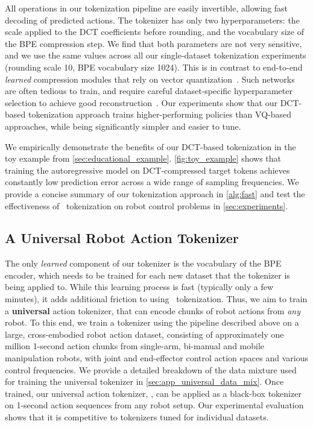 All operations in our tokenization pipeline are easily invertible, allowing fast decoding of predicted actions. The tokenizer has only two hyperparameters: the scale applied to the DCT coefficients before rounding, and the vocabulary size of the BPE compression step. We find that both parameters are not very sensitive, and we use the same values across all our single-dataset tokenization experiments (rounding scale 10, BPE vocabulary size 1024). This is in contrast to end-to-end \emph{learned} compression modules that rely on vector quantization~\cite{vqvae}. Such networks are often tedious to train, and require careful dataset-specific hyperparameter selection to achieve good reconstruction~\cite{yu2023magvit,fsq}. Our experiments show that our DCT-based tokenization approach trains higher-performing policies than VQ-based approaches, while being significantly simpler and easier to tune. %

We empirically demonstrate the benefits of our DCT-based tokenization in the toy example from \cref{sec:educational_example}. \cref{fig:toy_example} shows that training the autoregressive model on DCT-compressed target tokens achieves constantly low prediction error across a wide range of sampling frequencies. We provide a concise summary of our tokenization approach in \cref{alg:fast} and test the effectiveness of \ModelAcronym~tokenization on robot control problems in \cref{sec:experiments}. 


\subsection{A Universal Robot Action Tokenizer}
\label{sec:universal_tokenizer}

The only \emph{learned} component of our tokenizer is the vocabulary of the BPE encoder, which needs to be trained for each new dataset that the tokenizer is being applied to. While this learning process is fast (typically only a few minutes), it adds additional friction to using \ModelAcronym~tokenization. Thus, we aim to train a \textbf{universal} action tokenizer, that can encode chunks of robot actions from \emph{any} robot. To this end, we train a tokenizer using the pipeline described above on a large, cross-embodied robot action dataset, consisting of approximately one million 1-second action chunks from single-arm, bi-manual and mobile manipulation robots, with joint and end-effector control action spaces and various control frequencies. We provide a detailed breakdown of the data mixture used for training the universal tokenizer in \cref{sec:app_universal_data_mix}. Once trained, our universal action tokenizer, \ModelUniversalAcronym, can be applied as a black-box tokenizer on 1-second action sequences from any robot setup. Our experimental evaluation shows that it is competitive to tokenizers tuned for individual datasets. 

